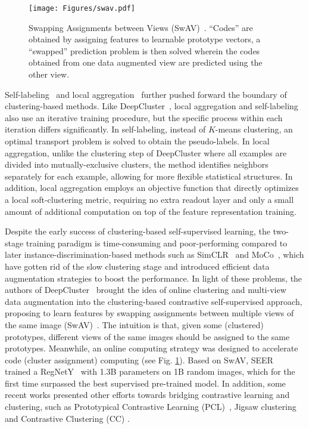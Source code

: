 \documentclass[lettersize,journal]{IEEEtran}
\begin{document}
\begin{figure}
\centering
\texttt{[image: Figures/swav.pdf]}
\caption[SwAV]{Swapping Assignments between Views (SwAV)~\cite{caron2020unsupervised}. “Codes” are obtained by assigning features to learnable prototype vectors, a “swapped” prediction problem is then solved wherein the codes obtained from one data augmented view are predicted using the other view.}
\label{fig:SwAV}
\end{figure}

Self-labeling~\cite{asano2019self} and local aggregation~\cite{zhuang2019local} further pushed forward the boundary of clustering-based methods. Like DeepCluster~\cite{caron2018deep}, local aggregation and self-labeling also use an iterative training procedure, but the specific process within each iteration differs significantly. In self-labeling, instead of $K$-means clustering, an optimal transport problem is solved to obtain the pseudo-labels. In local aggregation, unlike the clustering step of DeepCluster where all examples are divided into mutually-exclusive clusters, the method identifies neighbors separately for each example, allowing for more flexible statistical structures. In addition, local aggregation employs an objective function that directly optimizes a local soft-clustering metric, requiring no extra readout layer and only a small amount of additional computation on top of the feature representation training.



Despite the early success of clustering-based self-supervised learning, the two-stage training paradigm is time-consuming and poor-performing compared to later instance-discrimination-based methods such as SimCLR~\cite{chen2020simple} and MoCo~\cite{he2020momentum}, which have gotten rid of the slow clustering stage and introduced efficient data augmentation strategies to boost the performance. In light of these problems, the authors of DeepCluster~\cite{caron2018deep} brought the idea of online clustering and multi-view data augmentation into the clustering-based contrastive self-supervised approach, proposing to learn features by swapping assignments between multiple views of the same image (SwAV)~\cite{caron2020unsupervised}. The intuition is that, given some (clustered) prototypes, different views of the same images should be assigned to the same prototypes. Meanwhile, an online computing strategy was designed to accelerate code (cluster assignment) computing (see Fig. \ref{fig:SwAV}). Based on SwAV, SEER~\cite{goyal2021self} trained a RegNetY~\cite{radosavovic2020designing} with 1.3B parameters on 1B random images, which for the first time surpassed the best supervised pre-trained model. In addition, some recent works presented other efforts towards bridging contrastive learning and clustering, such as Prototypical Contrastive Learning (PCL)~\cite{li2020prototypical}, Jigsaw clustering~\cite{Chen_2021_CVPR} and Contrastive Clustering (CC) \cite{li2021contrastive}.
\end{document}
